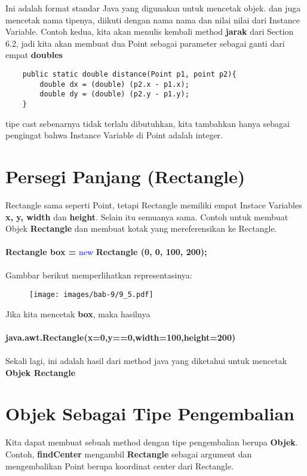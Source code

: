Ini adalah format standar Java yang digunakan untuk mencetak objek. dan juga mencetak nama tipenya, diikuti dengan nama nama dan nilai nilai dari Instance Variable.
Contoh kedua, kita akan menulis kembali method \textbf{jarak} dari Section 6.2, jadi kita akan membuat dua Point sebagai parameter sebagai ganti dari empat \textbf{doubles}
 
\begin{lstlisting}
	public static double distance(Point p1, point p2){
		double dx = (double) (p2.x - p1.x);
		double dy = (double) (p2.y - p1.y);
	}
\end{lstlisting}

tipe cast sebenarnya tidak terlalu dibutuhkan, kita tambahkan hanya sebagai pengingat bahwa Instance Variable di Point adalah integer.

\section{Persegi Panjang (Rectangle)}
Rectangle sama seperti Point, tetapi Rectangle memiliki empat Instace Variables \textbf{x, y, width} dan \textbf{height}. Selain itu semuanya sama.
Contoh untuk membuat Objek \textbf{Rectangle} dan membuat kotak yang mereferensikan ke Rectangle.\\
\\
\textbf{Rectangle box =} \textcolor{blue}{new} \textbf{Rectangle (0, 0, 100, 200);} \\
\\
Gambbar berikut memperlihatkan representasinya:
\begin{figure}[H]
	\centering \texttt{[image: images/bab-9/9\_5.pdf]}
\end{figure}
Jika kita mencetak \textbf{box}, maka hasilnya\\
\\
\textbf{java.awt.Rectangle(x=0,y==0,width=100,height=200)}\\
\\
Sekali lagi, ini adalah hasil dari method java yang diketahui untuk mencetak \textbf{Objek Rectangle}

\section{Objek Sebagai Tipe Pengembalian}
Kita dapat membuat sebuah method dengan tipe pengembalian berupa \textbf{Objek}. Contoh, \textbf{findCenter} mengambil \textbf{Rectangle} sebagai argument dan mengembalikan Point berupa koordinat center dari Rectangle.

